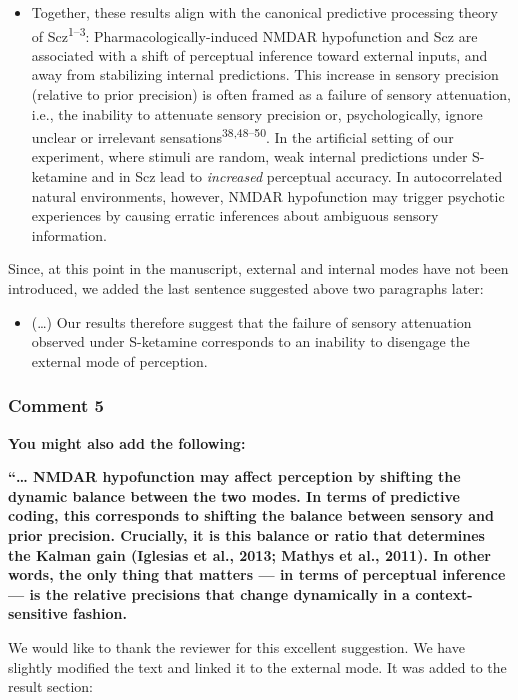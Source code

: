 \documentclass[
]{article}
\providecommand{\tightlist}{%
  \setlength{\itemsep}{0pt}\setlength{\parskip}{0pt}}
\begin{document}
\begin{itemize}
\tightlist
\item
  Together, these results align with the canonical predictive processing
  theory of Scz\textsuperscript{1--3}: Pharmacologically-induced NMDAR
  hypofunction and Scz are associated with a shift of perceptual
  inference toward external inputs, and away from stabilizing internal
  predictions. This increase in sensory precision (relative to prior
  precision) is often framed as a failure of sensory attenuation, i.e.,
  the inability to attenuate sensory precision or, psychologically,
  ignore unclear or irrelevant sensations\textsuperscript{38,48--50}. In
  the artificial setting of our experiment, where stimuli are random,
  weak internal predictions under S-ketamine and in Scz lead to
  \emph{increased} perceptual accuracy. In autocorrelated natural
  environments, however, NMDAR hypofunction may trigger psychotic
  experiences by causing erratic inferences about ambiguous sensory
  information.
\end{itemize}

Since, at this point in the manuscript, external and internal modes have
not been introduced, we added the last sentence suggested above two
paragraphs later:

\begin{itemize}
\tightlist
\item
  (\ldots) Our results therefore suggest that the failure of sensory
  attenuation observed under S-ketamine corresponds to an inability to
  disengage the external mode of perception.
\end{itemize}

\subsubsection{Comment 5}\label{comment-5}

\textbf{You might also add the following:}

\textbf{``\ldots{} NMDAR hypofunction may affect perception by shifting
the dynamic balance between the two modes. In terms of predictive
coding, this corresponds to shifting the balance between sensory and
prior precision. Crucially, it is this balance or ratio that determines
the Kalman gain (Iglesias et al., 2013; Mathys et al., 2011). In other
words, the only thing that matters --- in terms of perceptual inference
--- is the relative precisions that change dynamically in a
context-sensitive fashion.}

We would like to thank the reviewer for this excellent suggestion. We
have slightly modified the text and linked it to the external mode. It
was added to the result section:
\end{document}
